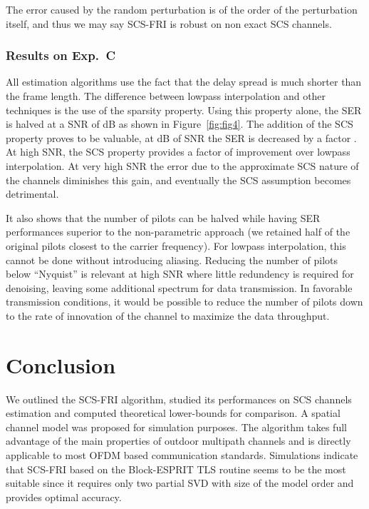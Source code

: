 \documentclass[journal,10pt]{IEEEtran}
\providecommand{\xp}[1]{\textsf{Exp.~{#1}}\ }
\begin{document}
The error caused by the random perturbation  is of the order of the perturbation itself, and thus we may say SCS-FRI is robust on non exact SCS channels.
\subsubsection{Results on \xp C}
All estimation algorithms use the fact that the delay spread is much shorter than the frame length. The difference between lowpass interpolation and other techniques is the use of the sparsity property. Using this property alone, the SER is halved at a SNR of dB as shown in Figure~\ref{fig:fig4}. The addition of the SCS property proves to be valuable, at dB of SNR the SER is decreased by a factor . At high SNR, the SCS property provides a factor  of improvement over lowpass interpolation. At very high SNR the error due to the approximate SCS nature of the channels diminishes this gain, and eventually the SCS assumption becomes detrimental.

It also shows that the number of pilots can be halved while having SER performances superior to the non-parametric approach (we retained half of the original pilots closest to the carrier frequency). For lowpass interpolation, this cannot be done without introducing aliasing. Reducing the number of pilots below ``Nyquist'' is relevant at high SNR where little redundency is required for denoising, leaving some additional spectrum for data transmission. In favorable transmission conditions, it would be possible to reduce the number of pilots down to the rate of innovation of the channel to maximize the data throughput.



 
















\section{Conclusion}
We outlined the SCS-FRI algorithm, studied its performances on SCS channels estimation and computed theoretical lower-bounds for comparison. A spatial channel model was proposed for simulation purposes. The algorithm takes full advantage of the main properties of outdoor multipath channels and is directly applicable to most OFDM based communication standards. Simulations indicate that SCS-FRI based on the Block-ESPRIT TLS routine seems to be the most suitable since it requires only two partial SVD with size of the model order and provides optimal accuracy.
\end{document}

